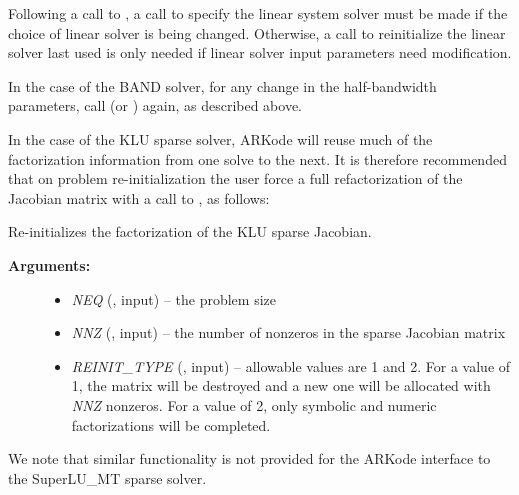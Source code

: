 \documentclass[letterpaper,10pt,english]{sphinxmanual}
\begin{document}
Following a call to {\hyperref[f_interface/Usage:f/_/FARKREINIT]{\emph{}}}, a call to specify the
linear system solver must be made if the choice of linear solver is
being changed.  Otherwise, a call to reinitialize the linear solver
last used is only needed if linear solver input parameters need
modification.

In the case of the BAND solver, for any change in the
half-bandwidth parameters, call {\hyperref[f_interface/Usage:f/_/FARKBAND]{\emph{}}} (or
{\hyperref[f_interface/Usage:f/_/FARKLAPACKBAND]{\emph{}}}) again, as described above.

In the case of the KLU sparse solver, ARKode will reuse much of the
factorization information from one solve to the next.  It is therefore
recommended that on problem re-initialization the user force a full
refactorization of the Jacobian matrix with a call to
{\hyperref[f_interface/Usage:f/_/FARKKLUREINIT]{\emph{}}}, as follows:

\begin{fulllineitems}
\label{f_interface/Usage:f/_/FARKKLUREINIT}
Re-initializes the factorization of the KLU sparse Jacobian.
\begin{description}
\item[{\textbf{Arguments:}}] \leavevmode\begin{itemize}
\item {} 
\emph{NEQ} (, input) -- the problem size

\item {} 
\emph{NNZ} (, input) -- the number of nonzeros in the
sparse Jacobian matrix

\item {} 
\emph{REINIT\_TYPE} (, input) -- allowable values are 1
and 2.  For a value of 1, the matrix will be destroyed and a
new one will be allocated with \emph{NNZ} nonzeros.  For a value of
2, only symbolic and numeric factorizations will be completed.

\end{itemize}

\end{description}

\end{fulllineitems}


We note that similar functionality is not provided for the ARKode
interface to the SuperLU\_MT sparse solver.
\end{document}
